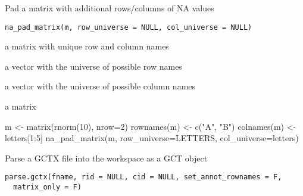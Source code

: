 \documentclass[letterpaper]{book}
\begin{document}
%
\begin{Description}\relax
Pad a matrix with additional rows/columns of NA values
\end{Description}
%
\begin{Usage}
\begin{verbatim}
na_pad_matrix(m, row_universe = NULL, col_universe = NULL)
\end{verbatim}
\end{Usage}
%
\begin{Arguments}
\begin{ldescription}
\item[\code{m}] a matrix with unique row and column names

\item[\code{row\_universe}] a vector with the universe of possible
row names

\item[\code{col\_universe}] a vector with the universe of possible
column names
\end{ldescription}
\end{Arguments}
%
\begin{Value}
a matrix
\end{Value}
%
\begin{Examples}
\begin{ExampleCode}
m <- matrix(rnorm(10), nrow=2)
rownames(m) <- c("A", "B")
colnames(m) <- letters[1:5]
na_pad_matrix(m, row_universe=LETTERS, col_universe=letters)

\end{ExampleCode}
\end{Examples}
%
\begin{Description}\relax
Parse a GCTX file into the workspace as a GCT object
\end{Description}
%
\begin{Usage}
\begin{verbatim}
parse.gctx(fname, rid = NULL, cid = NULL, set_annot_rownames = F,
  matrix_only = F)
\end{verbatim}
\end{Usage}
%
\end{document}
